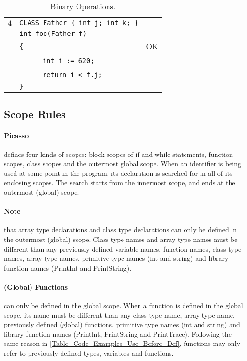 \documentclass{article}
\begin{document}
\begin{table}[h]
\begin{tabular}{|l|l|l|}
\hline
 $4$ & \verb"CLASS Father { int j; int k; }" &    \\
     & \verb"int foo(Father f)"              &    \\
     & \verb"{"                              & OK \\
     & ~ ~ ~ ~\verb"int i := 620;"           &    \\
     & ~ ~ ~ ~\verb"return i < f.j;"         &    \\
     & \verb"}"                              &    \\
\hline
\end{tabular}
\caption{Binary Operations.
\label{Table_Code_Examples_Binary_Operations}}
\end{table}
\newpage
\subsection{Scope Rules}
\label{subsection_Scope_Rules}
\paragraph{Picasso} defines four kinds of scopes:
block scopes of if and while statements,
function scopes,
class scopes and
the outermost global scope.
When an identifier is being used at some point in the program,
its declaration is searched for in all of its enclosing scopes.
The search starts from the innermost scope, 
and ends at the outermost (global) scope.
\paragraph{Note} that array type declarations and
class type declarations can only be defined
in the outermost (global) scope.
Class type names and array type names must be different than any
previously defined variable names, function names, class type names,
array type names, primitive type names (int and string) and library function names
(PrintInt and PrintString).
\paragraph{(Global) Functions} can only be defined in the global scope.
When a function is defined in the global scope, its name must be different than
any class type name, array type name, previously defined (global) functions,
primitive type names (int and string) and library function names (PrintInt, PrintString and PrintTrace).
Following the same reason in \ref{Table_Code_Examples_Use_Before_Def},
functions may only refer to previously defined types, variables and functions.
\end{document}

